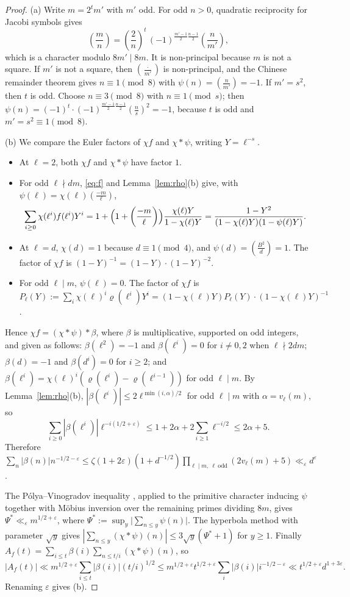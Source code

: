 \documentclass[11pt]{amsart}
\theoremstyle{remark}
\theoremstyle{definition}
\numberwithin{equation}{section}
\newcommand{\eps}{\varepsilon}
\newcommand{\leg}[2]{\left(\frac{#1}{#2}\right)}
\begin{document}
\begin{proof}
(a) Write $m=2^{t}m'$ with $m'$ odd. For odd $n>0$, quadratic reciprocity for Jacobi symbols gives
\[
\leg mn=\leg2n^{t}\,(-1)^{\frac{m'-1}2\frac{n-1}2}\leg n{m'},
\]
which is a character modulo $8m'\mid 8m$. It is non-principal because $m$ is not a square. If $m'$ is not a square, then $\leg{\cdot}{m'}$ is non-principal, and the Chinese remainder theorem gives $n\equiv1\pmod 8$ with $\psi(n)=\leg n{m'}=-1$. If $m'=s^2$, then $t$ is odd. Choose $n\equiv3\pmod 8$ with $n\equiv1\pmod s$; then $\psi(n)=(-1)^{t}\cdot(-1)^{\frac{m'-1}2\frac{n-1}2}\leg ns^2=-1$, because $t$ is odd and $m'=s^2\equiv1\pmod 8$.

(b) We compare the Euler factors of $\chi f$ and $\chi*\psi$, writing $Y=\ell^{-s}$.
\begin{itemize}
\item At $\ell=2$, both $\chi f$ and $\chi*\psi$ have factor $1$.
\item For odd $\ell\nmid dm$, \eqref{eq:f} and Lemma~\ref{lem:rho}(b) give, with $\psi(\ell)=\chi(\ell)\leg{-m}\ell$,
\[
\sum_{i\ge0}\chi(\ell^i)f(\ell^i)Y^i=1+\Bigl(1+\leg{-m}\ell\Bigr)\frac{\chi(\ell)Y}{1-\chi(\ell)Y}=\frac{1-Y^2}{(1-\chi(\ell)Y)(1-\psi(\ell)Y)}.
\]
\item At $\ell=d$, $\chi(d)=1$ because $d\equiv1\pmod 4$, and $\psi(d)=\leg{B^2}d=1$. The factor of $\chi f$ is $(1-Y)^{-1}=(1-Y)\cdot(1-Y)^{-2}$.
\item For odd $\ell\mid m$, $\psi(\ell)=0$. The factor of $\chi f$ is $P_\ell(Y):=\sum_i\chi(\ell)^i\varrho(\ell^i)Y^i=(1-\chi(\ell)Y)P_\ell(Y)\cdot(1-\chi(\ell)Y)^{-1}$.
\end{itemize}
Hence $\chi f=(\chi*\psi)*\beta$, where $\beta$ is multiplicative, supported on odd integers, and given as follows: $\beta(\ell^2)=-1$ and $\beta(\ell^i)=0$ for $i\ne0,2$ when $\ell\nmid 2dm$; $\beta(d)=-1$ and $\beta(d^i)=0$ for $i\ge2$; and $\beta(\ell^i)=\chi(\ell)^i(\varrho(\ell^i)-\varrho(\ell^{i-1}))$ for odd $\ell\mid m$. By Lemma~\ref{lem:rho}(b), $|\beta(\ell^i)|\le 2\ell^{\min(i,\alpha)/2}$ for odd $\ell\mid m$ with $\alpha=v_\ell(m)$, so
\[
\sum_{i\ge0}|\beta(\ell^i)|\ell^{-i(1/2+\eps)}\le1+2\alpha+2\sum_{i\ge1}\ell^{-i/2}\le2\alpha+5 .
\]
Therefore $\sum_n|\beta(n)|n^{-1/2-\eps}\le\zeta(1+2\eps)(1+d^{-1/2})\prod_{\ell\mid m,\ \ell\ \mathrm{odd}}(2v_\ell(m)+5)\ll_\eps d^{\eps}$.

The P\'olya--Vinogradov inequality \cite[Ch.~23]{Da}, applied to the primitive character inducing $\psi$ together with M\"obius inversion over the remaining primes dividing $8m$, gives $\Psi^*\ll_\eps m^{1/2+\eps}$, where $\Psi^*:=\sup_y\bigl|\sum_{n\le y}\psi(n)\bigr|$. The hyperbola method with parameter $\sqrt y$ gives $|\sum_{n\le y}(\chi*\psi)(n)|\le3\sqrt y(\Psi^*+1)$ for $y\ge1$. Finally $A_f(t)=\sum_{i\le t}\beta(i)\sum_{n\le t/i}(\chi*\psi)(n)$, so
\[
|A_f(t)|\ll m^{1/2+\eps}\sum_{i\le t}|\beta(i)|(t/i)^{1/2}\le m^{1/2+\eps}t^{1/2+\eps}\sum_i|\beta(i)|i^{-1/2-\eps}\ll t^{1/2+\eps}d^{1+3\eps}.
\]
Renaming $\eps$ gives (b).


\end{proof}
\end{document}

